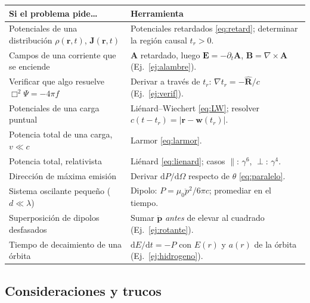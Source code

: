 \documentclass[11pt,a4paper]{article}
\newcommand{\rr}{\mathbf r}
\newcommand{\dd}{\mathrm d}
\newcommand{\boxop}{\Box^2}
\theoremstyle{remark}
\begin{document}
\begin{center}
\renewcommand{\arraystretch}{1.3}
\begin{tabularx}{\textwidth}{>{\raggedright}p{6.3cm}>{\raggedright\arraybackslash}X}
\toprule
\textbf{Si el problema pide\ldots} & \textbf{Herramienta}\\
\midrule
Potenciales de una distribución $\rho(\rr,t)$, $\mathbf J(\rr,t)$ & Potenciales retardados \eqref{eq:retard}; determinar la región causal $t_r>0$.\\
Campos de una corriente que se enciende & $\mathbf A$ retardado, luego $\mathbf E=-\partial_t\mathbf A$, $\mathbf B=\nabla\times\mathbf A$ (Ej.~\ref{ej:alambre}).\\
Verificar que algo resuelve $\boxop\Psi=-4\pi f$ & Derivar a través de $t_r$: $\nabla t_r=-\hat{\mathbf R}/c$ (Ej.~\ref{ej:verif}).\\
Potenciales de una carga puntual & Liénard--Wiechert \eqref{eq:LW}; resolver $c(t-t_r)=|\rr-\mathbf w(t_r)|$.\\
Potencia total de una carga, $v\ll c$ & Larmor \eqref{eq:larmor}.\\
Potencia total, relativista & Liénard \eqref{eq:lienard}; casos $\parallel$: $\gamma^6$, $\perp$: $\gamma^4$.\\
Dirección de máxima emisión & Derivar $\dd P/\dd\Omega$ respecto de $\theta$ \eqref{eq:paralelo}.\\
Sistema oscilante pequeño ($d\ll\lambda$) & Dipolo: $P=\mu_0\ddot p^2/6\pi c$; promediar en el tiempo.\\
Superposición de dipolos desfasados & Sumar $\ddot{\mathbf p}$ \emph{antes} de elevar al cuadrado (Ej.~\ref{ej:rotante}).\\
Tiempo de decaimiento de una órbita & $\dd E/\dd t=-P$ con $E(r)$ y $a(r)$ de la órbita (Ej.~\ref{ej:hidrogeno}).\\
\bottomrule
\end{tabularx}
\end{center}

\subsection{Consideraciones y trucos}
\end{document}
